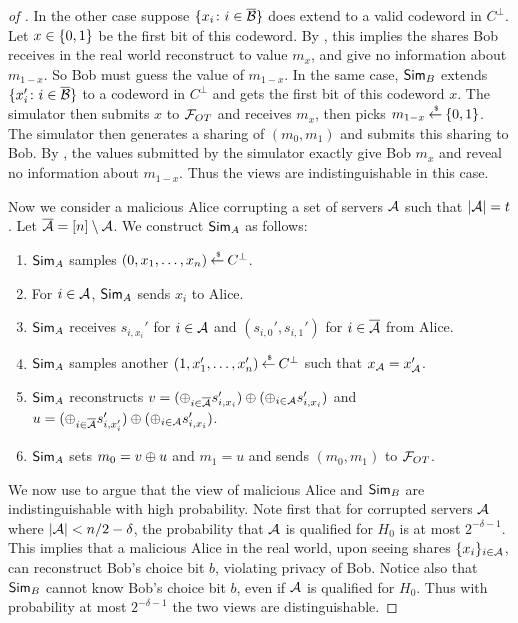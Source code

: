 \begin{proof}[of ]
	In the other case suppose $\{x_i \colon i \in \overline{{\mathcal B}} \}$ does extend to a valid codeword in $C^\perp$.
	Let $x \in {\{0,1\}}$ be the first bit of this codeword.
	By , this implies the shares Bob receives in the real world reconstruct to value $m_x$, and give no information about $m_{1-x}$.
	So Bob must guess the value of $m_{1-x}$.
	In the same case, $\mathsf{Sim}_B$ extends $\{ x_i' \colon i \in \overline{{\mathcal B}} \}$ to a codeword in $C^\perp$ and gets the first bit of this codeword $x$.
	The simulator then submits $x$ to ${\mathcal F}_{OT}$ and receives $m_x$, then picks $m_{1-x} \mathbin{\stackrel{\mbox{\,\tiny \$}}{\gets}} {\{0,1\}}$.
	The simulator then generates a sharing of $(m_0, m_1)$ and submits this sharing to Bob.
	By , the values submitted by the simulator exactly give Bob $m_x$ and reveal no information about $m_{1-x}$.
	Thus the views are indistinguishable in this case.
	
	Now we consider a malicious Alice corrupting a set of servers ${\mathcal A}$ such that $|{\mathcal A}| = t$.
	Let $\overline{{\mathcal A}} = [n]\setminus{\mathcal A}$.
	We construct $\mathsf{Sim}_A$ as follows:
	\begin{enumerate}
		\item $\mathsf{Sim}_A$ samples $(0, x_1,\dotsc, x_n) \mathbin{\stackrel{\mbox{\,\tiny \$}}{\gets}} C^\perp$.
		\item For $i \in {\mathcal A}$, $\mathsf{Sim}_A$ sends $x_i$ to Alice.
		\item $\mathsf{Sim}_A$ receives $s_{i,x_i}'$ for $i \in {\mathcal A}$ and $(s_{i,0}', s_{i,1}')$ for $i \in \overline{{\mathcal A}}$ from Alice.
		\item $\mathsf{Sim}_A$ samples another $(1, x_1', \dotsc, x_n') \mathbin{\stackrel{\mbox{\,\tiny \$}}{\gets}} C^\perp$ such that $x_{\mathcal A} = x'_{\mathcal A}$.
		\item $\mathsf{Sim}_A$ reconstructs $v = (\oplus_{i \in \overline{{\mathcal A}}} s_{i,x_i}') \oplus (\oplus_{i \in {\mathcal A}} s_{i,x_i}')$ and $u = (\oplus_{i \in \overline{{\mathcal A}}} s_{i,x_i'}')\oplus (\oplus_{i \in {\mathcal A}} s_{i,x_i}')$.
		\item $\mathsf{Sim}_A$ sets $m_0 = v \oplus u$ and $m_1 = u$ and sends $(m_0, m_1)$ to ${\mathcal F}_{OT}$.
	\end{enumerate}
	We now use  to argue that the view of malicious Alice and $\mathsf{Sim}_B$ are indistinguishable with high probability.
	Note first that for corrupted servers ${\mathcal A}$ where $|{\mathcal A}| < n/2 - \delta$, the probability that ${\mathcal A}$ is qualified for $H_0$ is at most $2^{-\delta-1}$.
	This implies that a malicious Alice in the real world, upon seeing shares $\{x_i\}_{i \in {\mathcal A}}$, can reconstruct Bob's choice bit $b$, violating privacy of Bob.
	Notice also that $\mathsf{Sim}_B$ cannot know Bob's choice bit $b$, even if ${\mathcal A}$ is qualified for $H_0$.
	Thus with probability at most $2^{-\delta-1}$ the two views are distinguishable.
	

\end{proof}
